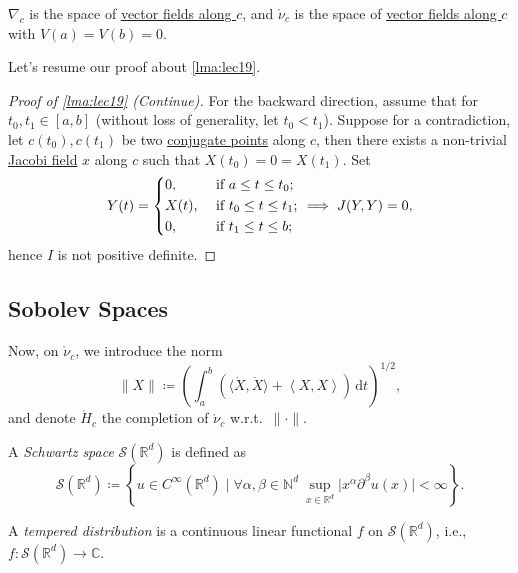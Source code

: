 \begin{prev}
	\(\nabla _c\) is the space of \hyperref[def:vector-field-along-curve]{vector fields along \(c\)}, and \(\mathring{\nu }_c\) is the space of \hyperref[def:vector-field-along-curve]{vector fields along \(c\)} with \(V(a) = V(b) = 0\).
\end{prev}

Let's resume our proof about \autoref{lma:lec19}.

\begin{proof}[Proof of \autoref{lma:lec19} (Continue)]
	For the backward direction, assume that for \(t_0, t_1\in [a, b]\) (without loss of generality, let \(t_0 < t_1\)). Suppose for a contradiction, let \(c(t_0), c(t_1)\) be two \hyperref[def:conjugate-point]{conjugate points} along \(c\), then there exists a non-trivial \hyperref[def:Jacobi-field]{Jacobi field} \(x\) along \(c\) such that \(X(t_0) = 0 = X(t_1)\). Set
	\[
		Y(t) = \begin{dcases}
			0,    & \text{ if } a \leq t \leq t_0 ;   \\
			X(t), & \text{ if } t_0 \leq t \leq t_1 ; \\
			0,    & \text{ if } t_1 \leq t \leq b;
		\end{dcases} \implies J(Y, Y) = 0,
	\]
	hence \(I\) is not positive definite.
\end{proof}

\subsection{Sobolev Spaces}
Now, on \(\mathring{\nu }_c\), we introduce the norm
\[
	\lVert X \rVert \coloneqq \left( \int_{a}^{b} \left( \langle \dot{X} , \dot{X} \rangle + \left\langle X, X \right\rangle  \right)  \,\mathrm{d}t \right) ^{1 / 2},
\]
and denote \(\mathring{H}_c\) the completion of \(\mathring{\nu}_c\) w.r.t.\ \(\lVert \cdot \rVert \).

\begin{definition}\label{def:Schwartz-space}
	A \emph{Schwartz space} \(\mathcal{S} (\mathbb{R} ^d)\) is defined as
	\[
		\mathcal{S} (\mathbb{R} ^d) \coloneqq \left\{ u\in C^{\infty} (\mathbb{R} ^d) \mid \forall \alpha , \beta \in \mathbb{N} ^d\ \sup _{x\in \mathbb{R} ^d} \vert x^\alpha \partial ^\beta u(x) \vert < \infty  \right\} .
	\]
\end{definition}

\begin{definition}\label{def:tempered-distribution}
	A \emph{tempered distribution} is a continuous linear functional \(f\) on \(\mathcal{S} (\mathbb{R} ^d)\), i.e., \(f\colon \mathcal{S} (\mathbb{R} ^d) \to \mathbb{C} \).
\end{definition}

